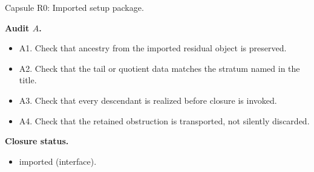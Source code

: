 \documentclass[11pt]{amsart}
\newcommand{\capsulefield}[1]{\par\smallskip\noindent\textbf{#1.}\ }
\begin{document}
\begin{proofcapsule}{Capsule R0: Imported setup package.}
  \capsulefield{Audit \(A\)}
  \begin{itemize}[leftmargin=1.8em]
  \item A1. Check that ancestry from the imported residual object is preserved.
  \item A2. Check that the tail or quotient data matches the stratum named in the title.
  \item A3. Check that every descendant is realized before closure is invoked.
  \item A4. Check that the retained obstruction is transported, not silently discarded.
  \end{itemize}
  \capsulefield{Closure status}
  \begin{itemize}[leftmargin=1.8em]
  \item imported (interface).
  \end{itemize}
\end{proofcapsule}
\end{document}
